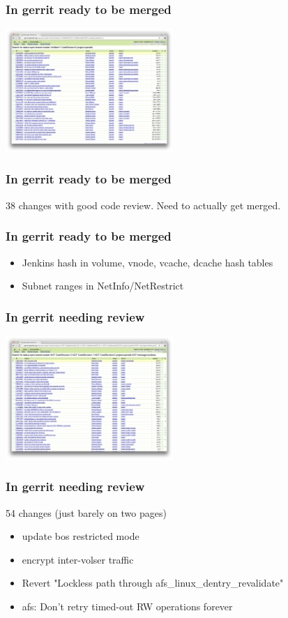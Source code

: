\documentclass{beamer}
\begin{document}
\begin{frame}
\frametitle{In gerrit ready to be merged}
\includegraphics[width=2.5in]{gerrit-approved}
\end{frame}

\begin{frame}
\frametitle{In gerrit ready to be merged}
38 changes with good code review.
\vspace{1em}
Need to actually get merged.
\end{frame}

\begin{frame}
\frametitle{In gerrit ready to be merged}
\begin{itemize}
\item{Jenkins hash in volume, vnode, vcache, dcache hash tables}
\item{Subnet ranges in NetInfo/NetRestrict}
\end{itemize}
\end{frame}

\begin{frame}
\frametitle{In gerrit needing review}
\includegraphics[width=2.5in]{gerrit-needsreview}
\end{frame}

\begin{frame}
\frametitle{In gerrit needing review}
54 changes (just barely on two pages)
\begin{itemize}
\item{update bos restricted mode}
\item{encrypt inter-volser traffic}
\item{Revert "Lockless path through afs\_linux\_dentry\_revalidate"}
\item{afs: Don't retry timed-out RW operations forever}
\end{itemize}
\end{frame}
\end{document}
